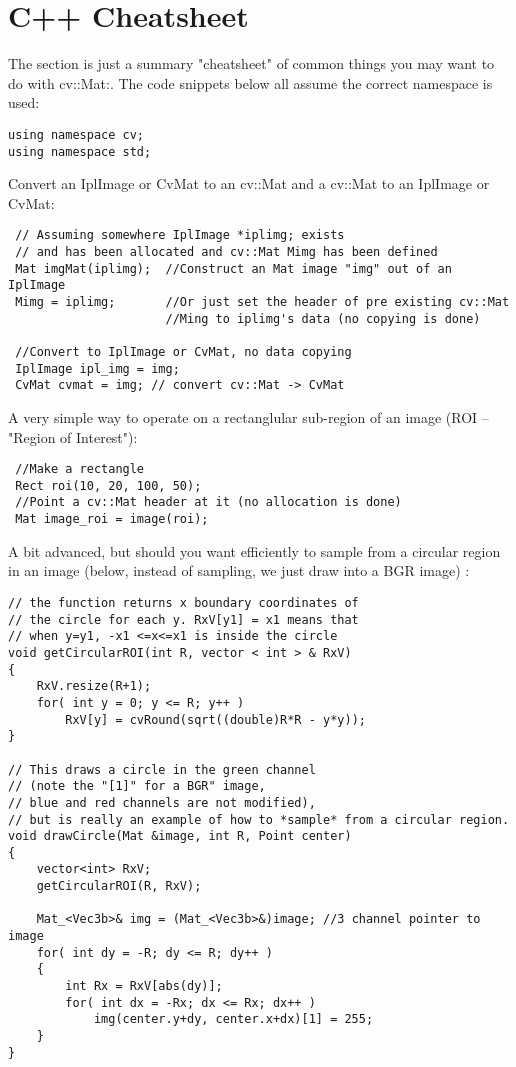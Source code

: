 \section{C++ Cheatsheet}\label{cheatSheet}
 The section is just a summary "cheatsheet" of common things you may want to do with cv::Mat:. The code snippets below all assume the correct 
 namespace is used:
 \begin{lstlisting}
using namespace cv;
using namespace std; 
 \end{lstlisting} 
 
 
 Convert an IplImage or CvMat to an cv::Mat and a cv::Mat to an IplImage or CvMat:
 \begin{lstlisting}
 // Assuming somewhere IplImage *iplimg; exists 
 // and has been allocated and cv::Mat Mimg has been defined
 Mat imgMat(iplimg);  //Construct an Mat image "img" out of an IplImage
 Mimg = iplimg;       //Or just set the header of pre existing cv::Mat 
                      //Ming to iplimg's data (no copying is done)
 
 //Convert to IplImage or CvMat, no data copying
 IplImage ipl_img = img;
 CvMat cvmat = img; // convert cv::Mat -> CvMat
 \end{lstlisting} 
 
 A very simple way to operate on a rectanglular sub-region of an image (ROI -- "Region of Interest"):
\begin{lstlisting}
 //Make a rectangle 
 Rect roi(10, 20, 100, 50);
 //Point a cv::Mat header at it (no allocation is done)
 Mat image_roi = image(roi);
\end{lstlisting}

A bit advanced, but should you want efficiently to sample from a circular region in an image  
(below, instead of sampling, we just draw into a BGR image) :

\begin{lstlisting}
// the function returns x boundary coordinates of 
// the circle for each y. RxV[y1] = x1 means that 
// when y=y1, -x1 <=x<=x1 is inside the circle
void getCircularROI(int R, vector < int > & RxV)
{
    RxV.resize(R+1);
    for( int y = 0; y <= R; y++ )
        RxV[y] = cvRound(sqrt((double)R*R - y*y));
}

// This draws a circle in the green channel
// (note the "[1]" for a BGR" image,
// blue and red channels are not modified),
// but is really an example of how to *sample* from a circular region. 
void drawCircle(Mat &image, int R, Point center)
{
    vector<int> RxV;
    getCircularROI(R, RxV);
	
    Mat_<Vec3b>& img = (Mat_<Vec3b>&)image; //3 channel pointer to image
    for( int dy = -R; dy <= R; dy++ )
    {
        int Rx = RxV[abs(dy)];
        for( int dx = -Rx; dx <= Rx; dx++ )
            img(center.y+dy, center.x+dx)[1] = 255;
    }
}
\end{lstlisting}


